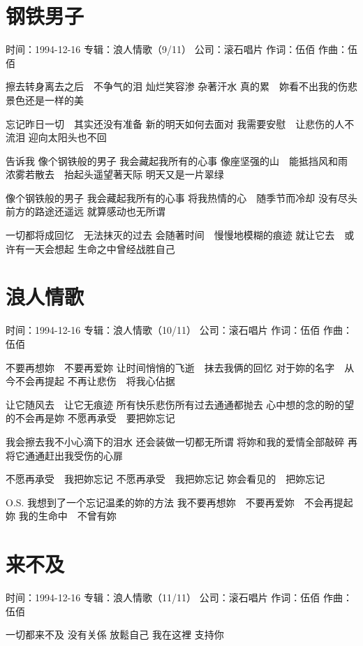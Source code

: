 \documentclass[UTF8,a4paper,oneside,twocolumn,12pt]{ctexbook}
\newcommand{\infopair}[2]{\textbullet #1：#2}
\newcommand{\zc}[1][伍佰]{\infopair{作词}{#1}}
\newcommand{\zq}[1][伍佰]{\infopair{作曲}{#1}}
\newcommand{\zj}[1]{\infopair{专辑}{#1}}
\newcommand{\sj}[1]{\infopair{时间}{#1}}
\newcommand{\gs}[1]{\infopair{公司}{#1}}
\newenvironment{info}{\begin{flushleft}\kaishu
	}
	{\end{flushleft}\normalsize\yahei\par}
\newenvironment{lyric}{
	}
{}
\begin{document}
\section{钢铁男子}
\begin{info}
	\sj{1994-12-16}
	\zj{浪人情歌（9/11）}
	\gs{滚石唱片}
	\zc
	\zq
\end{info}
\begin{lyric}
	擦去转身离去之后　不争气的泪
	灿烂笑容渗 杂著汗水
	真的累　妳看不出我的伤悲
	景色还是一样的美

	忘记昨日一切　其实还没有准备
	新的明天如何去面对
	我需要安慰　让悲伤的人不流泪
	迎向太阳头也不回

	告诉我
	像个钢铁般的男子
	我会藏起我所有的心事
	像座坚强的山　能抵挡风和雨
	浓雾若散去　抬起头遥望著天际
	明天又是一片翠绿

	像个钢铁般的男子
	我会藏起我所有的心事
	将我热情的心　随季节而冷却
	没有尽头　前方的路途还遥远
	就算感动也无所谓

	一切都将成回忆　无法抹灭的过去
	会随著时间　慢慢地模糊的痕迹
	就让它去　或许有一天会想起
	生命之中曾经战胜自己
\end{lyric}

\section{浪人情歌}
\begin{info}
	\sj{1994-12-16}
	\zj{浪人情歌（10/11）}
	\gs{滚石唱片}
	\zc
	\zq
\end{info}
\begin{lyric}
	不要再想妳　不要再爱妳
	让时间悄悄的飞逝　抹去我俩的回忆
	对于妳的名字　从今不会再提起
	不再让悲伤　将我心佔据

	让它随风去　让它无痕迹
	所有快乐悲伤所有过去通通都抛去
	心中想的念的盼的望的不会再是妳
	不愿再承受　要把妳忘记

	我会擦去我不小心滴下的泪水
	还会装做一切都无所谓
	将妳和我的爱情全部敲碎
	再将它通通赶出我受伤的心扉

	不愿再承受　我把妳忘记
	不愿再承受　我把妳忘记
	妳会看见的　把妳忘记

	O.S. 我想到了一个忘记温柔的妳的方法
	我不要再想妳　不要再爱妳　不会再提起妳
	我的生命中　不曾有妳
\end{lyric}

\section{来不及}
\begin{info}
	\sj{1994-12-16}
	\zj{浪人情歌（11/11）}
	\gs{滚石唱片}
	\zc
	\zq
\end{info}
\begin{lyric}
	一切都来不及
	没有关係
	放鬆自己
	我在这裡
	支持你
\end{lyric}
\end{document}

